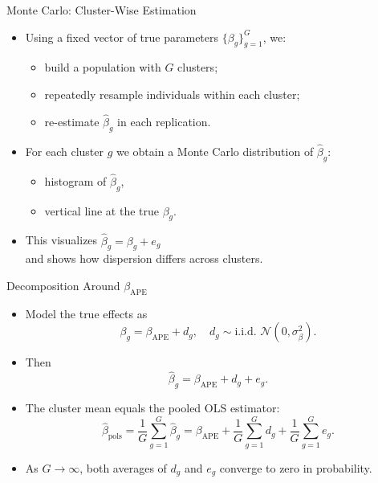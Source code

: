 \documentclass[
  ignorenonframetext,
]{beamer}
\providecommand{\tightlist}{%
  \setlength{\itemsep}{0pt}\setlength{\parskip}{0pt}}
\begin{document}
\begin{frame}{Monte Carlo: Cluster-Wise Estimation}
\label{monte-carlo-cluster-wise-estimation}
\begin{itemize}
\tightlist
\item
  Using a fixed vector of true parameters \(\{\beta_g\}_{g=1}^G\), we:

  \begin{itemize}
  \tightlist
  \item
    build a population with \(G\) clusters;
  \item
    repeatedly resample individuals within each cluster;
  \item
    re-estimate \(\hat{\beta}_g\) in each replication.
  \end{itemize}
\item
  For each cluster \(g\) we obtain a Monte Carlo distribution of
  \(\hat{\beta}_g\):

  \begin{itemize}
  \tightlist
  \item
    histogram of \(\hat{\beta}_g\),
  \item
    vertical line at the true \(\beta_g\).
  \end{itemize}
\item
  This visualizes \(\hat{\beta}_g = \beta_g + e_g\)\\
  and shows how dispersion differs across clusters.
\end{itemize}
\end{frame}

\begin{frame}{Decomposition Around \(\beta_{\text{APE}}\)}
\label{decomposition-around-beta_textape}
\begin{itemize}
\tightlist
\item
  Model the true effects as \[
  \beta_g = \beta_{\text{APE}} + d_g,\quad
  d_g \sim \text{i.i.d. } \mathcal{N}(0,\sigma^2_\beta).
  \]
\item
  Then \[
  \hat{\beta}_g = \beta_{\text{APE}} + d_g + e_g.
  \]
\item
  The cluster mean equals the pooled OLS estimator: \[
  \hat{\beta}_{\text{pols}}
  = \frac{1}{G}\sum_{g=1}^G \hat{\beta}_g
  = \beta_{\text{APE}}
    + \frac{1}{G}\sum_{g=1}^G d_g
    + \frac{1}{G}\sum_{g=1}^G e_g.
  \]
\item
  As \(G \to \infty\), both averages of \(d_g\) and \(e_g\) converge to
  zero in probability.
\end{itemize}
\end{frame}
\end{document}
